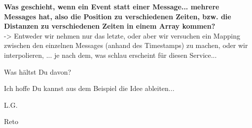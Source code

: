 \begin{formal}
	\textbf{Was geschieht, wenn ein Event statt einer Message... mehrere Messages hat, also die Position zu verschiedenen Zeiten, bzw. die Distanzen zu verschiedenen Zeiten in einem Array kommen?} \\
	-> Entweder wir nehmen nur das letzte, oder aber wir versuchen ein Mapping zwischen den einzelnen Messages (anhand des Timestamps) zu machen, oder wir interpolieren, ... je nach dem, was schlau erscheint für diesen Service...
	
	Was hältst Du davon?
	
	Ich hoffe Du kannst aus dem Beispiel die Idee ableiten...
	
	L.G.
	
	Reto
\end{formal}